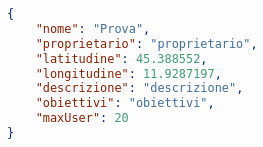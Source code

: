 \begin{lstlisting}[language=json,firstnumber=1, caption={Rappresentazione JSON della classe \texttt{Crew}}, label={img:Crew-classe-json}]
{
    "nome": "Prova",
    "proprietario": "proprietario",
    "latitudine": 45.388552,
    "longitudine": 11.9287197,
    "descrizione": "descrizione",
    "obiettivi": "obiettivi",
    "maxUser": 20
}  
\end{lstlisting}